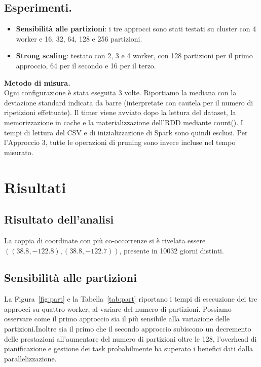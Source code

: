 \documentclass[10pt,a4paper]{article}
\begin{document}
\subsection{Esperimenti.} 
\begin{itemize}
    \item \textbf{Sensibilità alle partizioni}: i tre approcci sono stati testati su cluster con 4 worker e 16, 32, 64, 128 e 256 partizioni. 
    \item \textbf{Strong scaling}: testato con 2, 3 e 4 worker, con 128 partizioni per il primo approccio, 64 per il secondo e 16 per il terzo.    
\end{itemize}
\vspace{0.3cm}
\textbf{Metodo di misura.} \\
Ogni configurazione è stata eseguita 3 volte. Riportiamo la mediana con la deviazione standard indicata da barre (interpretate con cautela per il numero di ripetizioni effettuate).
Il timer viene avviato dopo la lettura del dataset, la memorizzazione in cache e la materializzazione dell'RDD mediante count(). I tempi di lettura del CSV e di inizializzazione di Spark sono quindi esclusi. Per l'Approccio 3, tutte le operazioni di pruning sono invece incluse nel tempo misurato.

\section{Risultati}
\subsection{Risultato dell'analisi}
    La coppia di coordinate con più co-occorrenze si è rivelata essere $((38.8,-122.8),(38.8,-122.7))$, presente in 10032 giorni distinti.

\subsection{Sensibilità alle partizioni} 
    La Figura~\ref{fig:part} e la Tabella~\ref{tab:part} riportano i tempi di esecuzione dei tre approcci su quattro worker, al variare del numero di partizioni. Possiamo osservare come il primo approccio sia il più sensibile alla variazione delle partizioni.Inoltre sia il primo che il secondo approccio subiscono un decremento delle prestazioni all'aumentare del numero di partizioni oltre le 128, l'overhead di pianificazione e gestione dei task probabilmente ha superato i benefici dati dalla parallelizzazione. 
\end{document}
